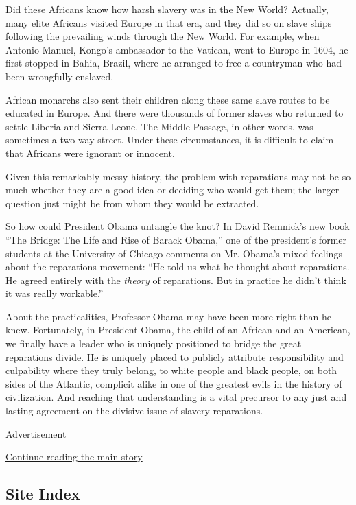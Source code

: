 Did these Africans know how harsh slavery was in the New World?
Actually, many elite Africans visited Europe in that era, and they did
so on slave ships following the prevailing winds through the New World.
For example, when Antonio Manuel, Kongo's ambassador to the Vatican,
went to Europe in 1604, he first stopped in Bahia, Brazil, where he
arranged to free a countryman who had been wrongfully enslaved.

African monarchs also sent their children along these same slave routes
to be educated in Europe. And there were thousands of former slaves who
returned to settle Liberia and Sierra Leone. The Middle Passage, in
other words, was sometimes a two-way street. Under these circumstances,
it is difficult to claim that Africans were ignorant or innocent.

Given this remarkably messy history, the problem with reparations may
not be so much whether they are a good idea or deciding who would get
them; the larger question just might be from whom they would be
extracted.

So how could President Obama untangle the knot? In David Remnick's new
book ``The Bridge: The Life and Rise of Barack Obama,'' one of the
president's former students at the University of Chicago comments on Mr.
Obama's mixed feelings about the reparations movement: ``He told us what
he thought about reparations. He agreed entirely with the \emph{theory}
of reparations. But in practice he didn't think it was really
workable.''

About the practicalities, Professor Obama may have been more right than
he knew. Fortunately, in President Obama, the child of an African and an
American, we finally have a leader who is uniquely positioned to bridge
the great reparations divide. He is uniquely placed to publicly
attribute responsibility and culpability where they truly belong, to
white people and black people, on both sides of the Atlantic, complicit
alike in one of the greatest evils in the history of civilization. And
reaching that understanding is a vital precursor to any just and lasting
agreement on the divisive issue of slavery reparations.

Advertisement

\protect\hyperlink{after-bottom}{Continue reading the main story}

\hypertarget{site-index}{%
\subsection{Site Index}\label{site-index}}

